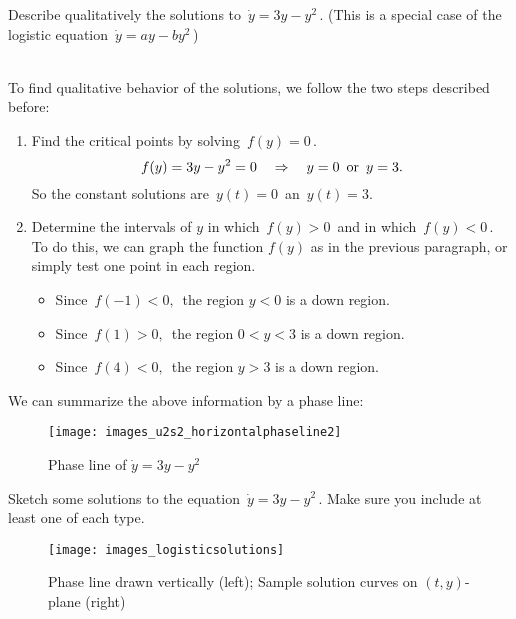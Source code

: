 \begin{example}
  Describe qualitatively the solutions to $\, \dot y = 3y - y^2\,$.
  (This is a special case of the logistic equation
  $\, \dot y = ay - by^2\,$)
\end{example}

\Solution \\
To find qualitative behavior of the solutions, we follow the two steps described before:

\begin{enumerate}
\item Find the critical points by solving $\, f(y) = 0 \,$.
  \begin{equation*}
    \displaystyle  \displaystyle f(y)=3y-y^2=0
    \quad \Rightarrow
    \quad \displaystyle  y=0\, \, \, \text {or} \, \, \, y=3.
  \end{equation*}
  So the constant solutions are $\, y(t) = 0\,$ an $\, y(t) = 3$.
\item Determine the intervals of $y$
  in which $\, f(y) > 0 \,$ and in which $\, f(y) < 0\,$.
  To do this, we can graph the function $f(y)$ as in the previous paragraph,
  or simply test one point in each region.
  \begin{itemize}
  \item Since $\, f(−1)<0,\,$ the region $y < 0$ is a down region.
  \item Since $\, f(1)>0,\,$ the region $0< y < 3$ is a down region.
  \item Since $\, f(4)<0,\,$ the region $y > 3$ is a down region.
  \end{itemize}
\end{enumerate}

\clearpage

We can summarize the above information by a phase line:

\begin{figure}[ht!]
  \centering
  \texttt{[image: images\_u2s2\_horizontalphaseline2]}
  \caption{Phase line of $\dot y = 3y - y^2$}
\end{figure}

\begin{example}
  Sketch some solutions to the equation $\, \dot y = 3y - y^2\,$.
  Make sure you include at least one of each type.
\end{example}

\begin{figure}[ht!]
  \centering
  \texttt{[image: images\_logisticsolutions]}
  \caption{Phase line drawn vertically (left); Sample solution curves on $(t,y)$-plane (right)}
\end{figure}

